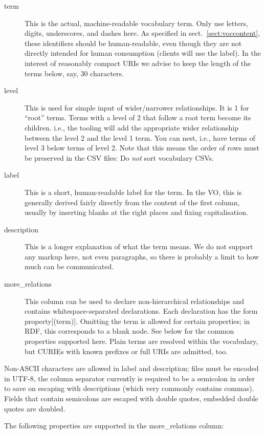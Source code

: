 \documentclass[11pt,a4paper]{ivoa}
\begin{document}
\begin{description}
\item[term]
  This is the actual, machine-readable vocabulary term.  Only use
  letters, digits, underscores, and dashes here.  As specified in
  sect.~\ref{sect:voccontent}, these identifiers should be
  human-readable, even though they are not directly intended for human
  consumption (clients will use the label).  In the interest of
  reasonably compact URIs we advise to keep the length of the
  terms below, say, 30 characters.
\item[level]
  This is used for simple input of wider/narrower relationships.
  It is 1 for ``root'' terms.  Terms with a level of 2 that follow a
  root term become its children. i.e., the tooling will add the
  appropriate wider relationship between the level 2 and the level 1
  term.  You can nest, i.e., have
  terms of level 3 below terms of level 2.  Note that this means the
  order of rows must be preserved in the CSV files: Do \emph{not} sort
  vocabulary CSVs.
\item[label]
  This is a short, human-readable label for the term.  In the VO, this
  is generally derived fairly directly from the content of the first
  column, usually by
  inserting blanks at the right places and fixing capitalisation.
\item[description]
  This is a longer explanation of what the term means.  We do not
  support any markup here, not even paragraphs, so there is probably a
  limit to how much can be communicated.
\item[more\_relations] 
  This column can be used to declare non-hierarchical relationships
  and contains whitespace-separated declarations.  Each declaration has
  the form property[(term)].  Omitting the term is allowed for certain
  properties; in RDF, this corresponds to a blank node.  See below for 
  the common properties supported here.  Plain terms are resolved 
  within the vocabulary, but CURIEs with known prefixes or full URIs are
  admitted, too.
\end{description}

Non-ASCII characters are allowed in label and description; files must be
encoded in UTF-8, the column separator currently is required to be a
semicolon in order to save on escaping with descriptions (which very
commonly contains commas).  Fields that contain semicolons are escaped
with double quotes, embedded double quotes are doubled.

The following properties are supported in the more\_relations
column:
\end{document}
